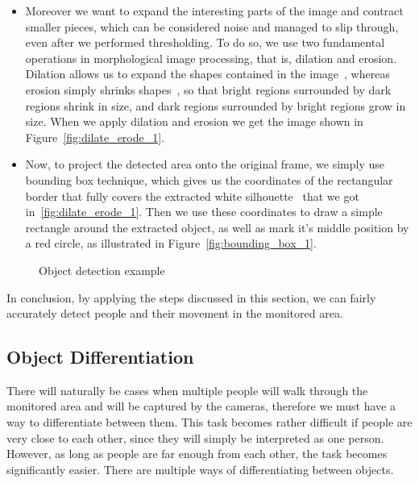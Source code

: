 \begin{itemize}
	\item Moreover we want to expand the interesting parts of the image and contract smaller pieces, which can be considered noise and managed to slip through, even after we performed thresholding. To do so, we use two fundamental operations in morphological image processing, that is, dilation and erosion. Dilation allows us to expand the shapes contained in the image~\cite{dilation_1}, whereas erosion simply shrinks shapes~\cite{erosion_1}, so that bright regions surrounded by dark regions shrink in size, and dark regions surrounded by bright regions grow in size. When we apply dilation and erosion we get the image shown in Figure~\ref{fig:dilate_erode_1}. 
	
	\item Now, to project the detected area onto the original frame, we simply use bounding box technique, which gives us the coordinates of the rectangular border that fully covers the extracted white silhouette~\cite{bounding_box_1} that we got in~\ref{fig:dilate_erode_1}. Then we use these coordinates to draw a simple rectangle around the extracted object, as well as mark it's middle position by a red circle, as illustrated in Figure~\ref{fig:bounding_box_1}.
	\end{itemize}
	\begin{figure}[ht]
		\centering
		\quad
		\quad
		\quad
		\caption{Object detection example}
		\label{fig:object_detection_example}
	\end{figure}
	
	In conclusion, by applying the steps discussed in this section, we can fairly accurately detect people and their movement in the monitored area.
	
	\subsection{Object Differentiation}
	\label{object_differentiation}
	There will naturally be cases when multiple people will walk through the monitored area and will be captured by the cameras, therefore we must have a way to differentiate between them. This task becomes rather difficult if people are very close to each other, since they will simply be interpreted as one person. However, as long as people are far enough from each other, the task becomes significantly easier. There are multiple ways of differentiating between objects. 
	
